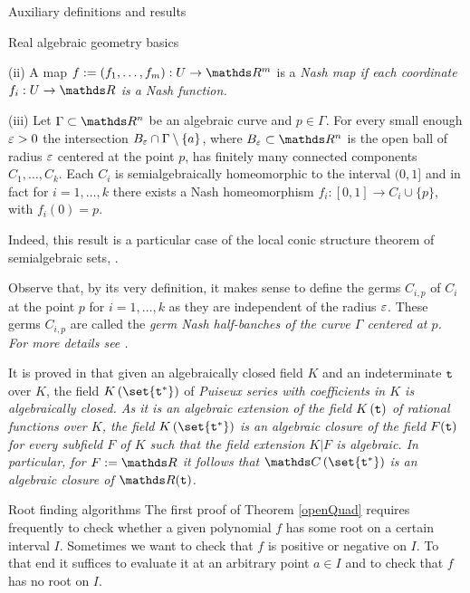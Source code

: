 \documentclass[11pt, a4paper, english, twoside, notitlepage, openright]{report}
\begin{document}
\begin{chapter}{Auxiliary definitions and results}
\begin{section}{Real algebraic geometry basics}
\begin{definitions}
	(ii) A map $f:=(f_1,\dots,f_m):U\to\R^m$ is a \em Nash map \em if each coordinate $f_i:U\to\R$ is a Nash function. 
	
	(iii) Let $\Gamma\subset\R^n$ be an algebraic curve and $p\in\Gamma$. For every small enough $\varepsilon>0$ the intersection $B_{\varepsilon}\cap\Gamma\setminus\{a\}$, %
where $B_{\eps}\subset\R^n$ is the open ball of radius $\varepsilon$ centered at the point $p$, has finitely many connected components $C_1,\dots,C_k$. Each $C_i$ is semialgebraically homeomorphic to the interval $(0,1]$ and in fact for $i=1,\dots,k$ there exists a Nash homeomorphism  $f_i:[0,1]\to C_i\cup\{p\}$, with $f_i(0)=p$.

Indeed, this result is a particular case of the local conic structure theorem of semialgebraic sets, \cite[IX.3.6]{bcr}. 
	
Observe that, by its very definition, it makes sense to define the germs $C_{i,p}$ of $C_i$ at the point $p$ for $i=1,\dots,k$ as they are independent of the radius $\varepsilon$. These germs  $C_{i,p}$ are called the \em germ Nash half-banches \em of the curve $\Gamma$ centered at $p$. For more details see \cite[IX.5.2]{bcr}. 
\end{definitions}

\begin{definition} \label{puiseux} It is proved in \cite[pp. 98-102]{w} that given an algebraically closed field $K$ and an indeterminate ${\tt t}$ over $K$, the field $K\left(\set{{\tt t}^*}\right)$ of \em Puiseux series \em with coefficients in $K$ is algebraically closed. As it is an algebraic extension of the field $K\left({\tt t}\right)$ of rational functions over $K$, the field $K\left(\set{{\tt t}^*}\right)$ is an algebraic closure of the field $F({\tt t})$ for every subfield $F$ of $K$ such that the field extension $K|F$ is algebraic. In particular, for $F:=\R$ it follows that $\C\left(\set{{\tt t}^*}\right)$ is an algebraic closure of $\R({\tt t})$.
\end{definition}
\end{section}

\begin{section}{Root finding algorithms}
The first proof of Theorem \ref{openQuad} requires frequently to check whether a given polynomial $f$ has some root on a certain interval $I$. Sometimes we want to check that $f$ is positive or negative on $I$. To that end it suffices to evaluate it at an arbitrary point $a\in I$ and to check that $f$ has no root on $I$.


\end{section}
\end{chapter}
\end{document}

